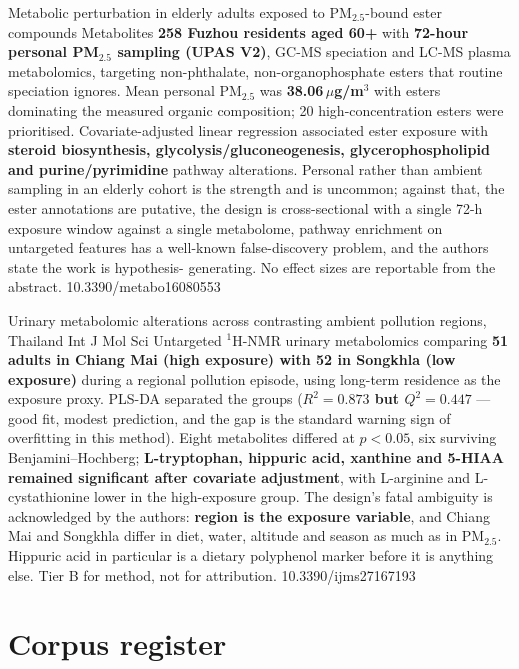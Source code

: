 \documentclass[10pt]{article}
\begin{document}
{Metabolic perturbation in elderly adults exposed to PM$_{2.5}$-bound ester compounds}
{Metabolites}
{\textbf{258 Fuzhou residents aged 60+} with \textbf{72-hour personal PM$_{2.5}$ sampling
(UPAS V2)}, GC-MS speciation and LC-MS plasma metabolomics, targeting non-phthalate,
non-organophosphate esters that routine speciation ignores. Mean personal PM$_{2.5}$ was
\textbf{38.06\,$\mu$g/m$^3$} with esters dominating the measured organic composition;
20 high-concentration esters were prioritised. Covariate-adjusted linear regression
associated ester exposure with \textbf{steroid biosynthesis, glycolysis/gluconeogenesis,
glycerophospholipid and purine/pyrimidine} pathway alterations. Personal rather than
ambient sampling in an elderly cohort is the strength and is uncommon; against that, the
ester annotations are putative, the design is cross-sectional with a single 72-h exposure
window against a single metabolome, pathway enrichment on untargeted features has a
well-known false-discovery problem, and the authors state the work is hypothesis-
generating. No effect sizes are reportable from the abstract.}
{10.3390/metabo16080553}

{Urinary metabolomic alterations across contrasting ambient pollution regions, Thailand}
{Int J Mol Sci}
{Untargeted $^1$H-NMR urinary metabolomics comparing \textbf{51 adults in Chiang Mai
(high exposure) with 52 in Songkhla (low exposure)} during a regional pollution episode,
using long-term residence as the exposure proxy. PLS-DA separated the groups
(\textbf{$R^2 = 0.873$ but $Q^2 = 0.447$} --- good fit, modest prediction, and the gap is
the standard warning sign of overfitting in this method). Eight metabolites differed at
$p < 0.05$, six surviving Benjamini--Hochberg; \textbf{L-tryptophan, hippuric acid,
xanthine and 5-HIAA remained significant after covariate adjustment}, with L-arginine and
L-cystathionine lower in the high-exposure group. The design's fatal ambiguity is
acknowledged by the authors: \textbf{region is the exposure variable}, and Chiang Mai and
Songkhla differ in diet, water, altitude and season as much as in PM$_{2.5}$. Hippuric
acid in particular is a dietary polyphenol marker before it is anything else. Tier B for
method, not for attribution.}
{10.3390/ijms27167193}

\clearpage

\section*{\sffamily\bfseries\color{Deep}Corpus register}
\vspace{-1.5mm}{\color{Amber}\rule{\linewidth}{1.1pt}}\vspace{2.5mm}
\end{document}
